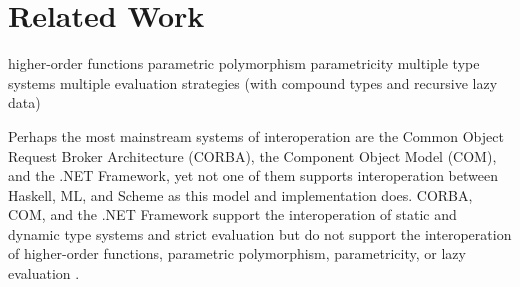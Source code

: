 \chapter{Related Work}

higher-order functions
parametric polymorphism
parametricity
multiple type systems
multiple evaluation strategies (with compound types and recursive lazy data)

Perhaps the most mainstream systems of interoperation are the Common Object Request Broker Architecture (CORBA), the Component Object Model (COM), and the .NET Framework, yet not one of them supports interoperation between Haskell, ML, and Scheme as this model and implementation does.  CORBA, COM, and the .NET Framework support the interoperation of static and dynamic type systems and strict evaluation but do not support the interoperation of higher-order functions, parametric polymorphism, parametricity, or lazy evaluation \cite{omg04} \cite{microsoft07} \cite{ecma06}.

